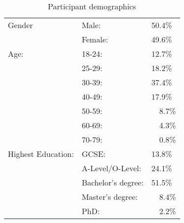 \begin{table}[h]
    \centering
    \begin{tabular}{|l|ll|}
        \hline
        Gender & Male: & 50.4\% \\
               & Female: & 49.6\% \\
        \hline
        Age:   & 18-24: & 12.7\% \\ 
               & 25-29: & 18.2\% \\ 
               & 30-39: & 37.4\% \\ 
               & 40-49: & 17.9\% \\ 
               & 50-59: & ~~8.7\% \\ 
               & 60-69: & ~~4.3\% \\ 
               & 70-79: & ~~0.8\% \\ 

        \hline
        Highest Education:  
        & GCSE:                 & 13.8\%  \\
        & A-Level/O-Level:      & 24.1\% \\
        & Bachelor's degree:    & 51.5\% \\
        & Master's degree:      & ~~8.4\% \\ 
        & PhD:                  & ~~2.2\% \\
        \hline

    \end{tabular}
    \caption{Participant demographics}
    \label{tab:exp2_demo}
\end{table}

